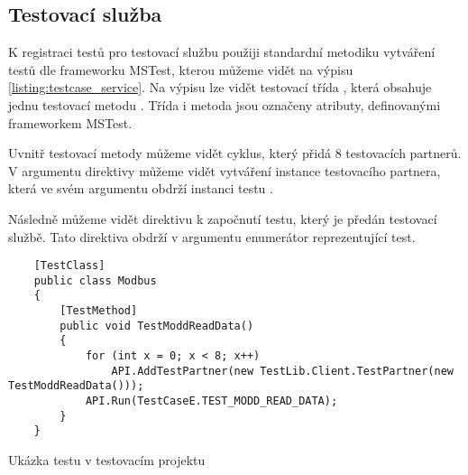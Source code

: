\subsection{Testovací služba}

K registraci testů pro testovací službu použiji standardní metodiku vytváření testů dle frameworku MSTest, kterou můžeme vidět na výpisu \ref{listing:testcase_service}. Na výpisu lze vidět testovací třída , která obsahuje jednu testovací metodu . Třída i metoda jsou označeny atributy, definovanými frameworkem MSTest. 

Uvnitř testovací metody můžeme vidět cyklus, který přidá 8 testovacích partnerů. V argumentu direktivy můžeme vidět vytváření instance testovacího partnera, která ve svém argumentu obdrží instanci testu .
 
Následně můžeme vidět direktivu k započnutí testu, který je předán testovací službě. Tato direktiva obdrží v argumentu enumerátor reprezentující test.

\begin{listing}[htbp]
    \centering
    \begin{verbatim}
    [TestClass]
    public class Modbus
    {
        [TestMethod]
        public void TestModdReadData()
        {
            for (int x = 0; x < 8; x++)
                API.AddTestPartner(new TestLib.Client.TestPartner(new TestModdReadData()));
            API.Run(TestCaseE.TEST_MODD_READ_DATA);
        }
    }
    \end{verbatim}
\caption{Ukázka testu v testovacím projektu}
\label{listing:testcase_service}
\end{listing}



